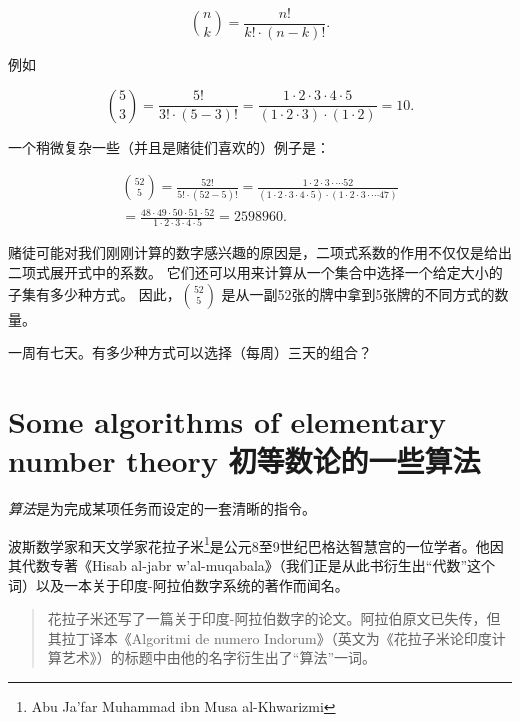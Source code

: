\[ \binom{n}{k} = \frac{n!}{k! \cdot (n-k)!}. \]

例如

\[ \binom{5}{3} = \frac{5!}{3! \cdot (5-3)!} = \frac{1\cdot 2\cdot 3\cdot 4\cdot 5}{(1\cdot 2\cdot 3) \cdot (1\cdot 2)} = 10. \]

一个稍微复杂一些（并且是赌徒们喜欢的）例子是：

\begin{gather*}
  \binom{52}{5} = \frac{52!}{5! \cdot (52-5)!}
  = \frac{1\cdot 2\cdot 3\cdot \cdots 52}{(1\cdot 2\cdot 3 \cdot 4 \cdot 5) \cdot (1\cdot 2 \cdot 3\cdot \cdots 47)}\\
  = \frac{48 \cdot 49 \cdot 50 \cdot 51 \cdot 52}{1\cdot 2\cdot 3 \cdot 4 \cdot 5} = 2598960.
\end{gather*}

赌徒可能对我们刚刚计算的数字感兴趣的原因是，二项式系数的作用不仅仅是给出二项式展开式中的系数。
它们还可以用来计算从一个集合中选择一个给定大小的子集有多少种方式。
因此，$\binom{52}{5}$ 是从一副52张的牌中拿到5张牌的不同方式的数量。

\begin{exer}
  一周有七天。有多少种方式可以选择（每周）三天的组合？
\end{exer}

\newpage




\newpage

\section[Some algorithms 一些算法]{Some algorithms of elementary number theory 初等数论的一些算法}
\label{sec:alg}


\emph{算法}是为完成某项任务而设定的一套清晰的指令。


波斯数学家和天文学家花拉子米\footnote{Abu Ja'far Muhammad ibn Musa al-Khwarizmi}是公元8至9世纪巴格达智慧宫的一位学者。他因其代数专著《Hisab al-jabr w'al-muqabala》（我们正是从此书衍生出“代数”这个词）以及一本关于印度-阿拉伯数字系统的著作而闻名。


\begin{quote}
  花拉子米还写了一篇关于印度-阿拉伯数字的论文。阿拉伯原文已失传，但其拉丁译本《Algoritmi de numero Indorum》（英文为《花拉子米论印度计算艺术》）的标题中由他的名字衍生出了“算法”一词。~\cite{HisMathArch}
\end{quote}


